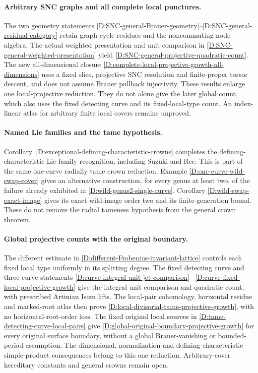 \paragraph{Arbitrary SNC graphs and all complete local punctures.}
The two geometry statements
\ref{D:SNC-general-Brauer-geometry}--\ref{D:SNC-general-residual-category}
retain graph-cycle residues and the noncommuting node algebra.
The actual weighted presentation and unit comparison in
\ref{D:SNC-general-weighted-presentation} yield
\ref{D:SNC-general-projective-quadratic-count}. The new all-dimensional
closure \ref{D:complete-local-projective-growth-all-dimensions}
uses a fixed slice, projective SNC resolution and finite-proper torsor
descent, and does not assume Brauer pullback injectivity.
These results enlarge one local-projective reduction. They do not
alone give the later global count, which also uses the fixed detecting
curve and its fixed-local-type count. An index-linear atlas for
arbitrary finite local covers remains unproved.


\paragraph{Named Lie families and the tame hypothesis.}
Corollary~\ref{D:exceptional-defining-characteristic-crowns}
completes the defining-characteristic Lie-family recognition,
including Suzuki and Ree. This is part of the same one-curve
radially tame crown reduction. Example
\ref{D:one-curve-wild-swap-cover} gives an alternative construction,
for every genus at least two, of the failure already exhibited in
\ref{D:wild-genus2-single-curve}. Corollary
\ref{D:wild-swap-exact-image} gives its exact wild-image order two
and its finite-generation bound. These do not remove the radial
tameness hypothesis from the general crown theorem.

\paragraph{Global projective counts with the original boundary.}
The different estimate in
\ref{D:different-Frobenius-invariant-lattice} controls each fixed
local type uniformly in its splitting degree. The fixed detecting
curve and three curve statements
\ref{D:curve-integral-unit-jet-comparison}--
\ref{D:curve-fixed-local-projective-growth} give the integral unit
comparison and quadratic count, with prescribed Artinian Isom lifts.
The local-pair cohomology, horizontal residue and marked-root atlas
then prove \ref{D:local-divisorial-tame-projective-growth}, with no
horizontal-root-order loss. The fixed original local sources in
\ref{D:tame-detecting-curve-local-pairs} give
\ref{D:global-original-boundary-projective-growth} for every original
surface boundary, without a global Brauer-vanishing or bounded-period
assumption. The dimensional, normalization and defining-characteristic
simple-product consequences belong to this one reduction.
Arbitrary-cover hereditary constants and general crowns remain open.

